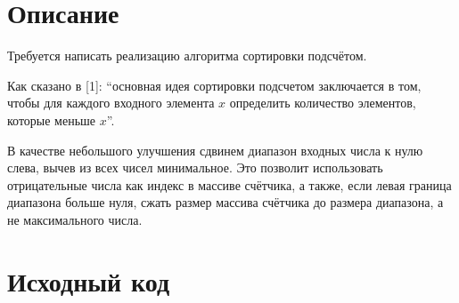 \section{Описание}
Требуется написать реализацию алгоритма сортировки подсчётом.

Как сказано в [1]: \enquote{основная идея сортировки подсчетом заключается в том, чтобы для каждого входного 
элемента $x$ определить количество элементов, которые меньше $x$}.

В качестве небольшого улучшения сдвинем диапазон входных числа к нулю слева, вычев из всех чисел минимальное.
Это позволит использовать отрицательные числа как индекс в массиве счётчика, а также, если левая граница диапазона больше нуля, сжать размер массива счётчика до размера диапазона, а не максимального числа.

\pagebreak

\section{Исходный код}

